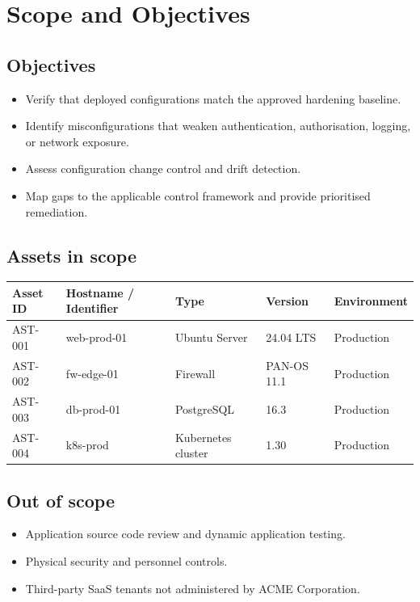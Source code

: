 \documentclass[11pt,a4paper]{article}
\newcommand{\ClientName}{ACME Corporation}
\begin{document}
\section{Scope and Objectives}

\subsection{Objectives}
\begin{itemize}
  \item Verify that deployed configurations match the approved hardening baseline.
  \item Identify misconfigurations that weaken authentication, authorisation, logging, or network exposure.
  \item Assess configuration change control and drift detection.
  \item Map gaps to the applicable control framework and provide prioritised remediation.
\end{itemize}

\subsection{Assets in scope}
\begin{longtable}{@{}l l l l l@{}}
\toprule
\textbf{Asset ID} & \textbf{Hostname / Identifier} & \textbf{Type} & \textbf{Version} & \textbf{Environment} \\
\midrule\endhead
AST-001 & web-prod-01 & Ubuntu Server & 24.04 LTS & Production \\
AST-002 & fw-edge-01 & Firewall & PAN-OS 11.1 & Production \\
AST-003 & db-prod-01 & PostgreSQL & 16.3 & Production \\
AST-004 & k8s-prod & Kubernetes cluster & 1.30 & Production \\
\bottomrule
\end{longtable}

\subsection{Out of scope}
\begin{itemize}
  \item Application source code review and dynamic application testing.
  \item Physical security and personnel controls.
  \item Third-party SaaS tenants not administered by \ClientName.
\end{itemize}
\end{document}
